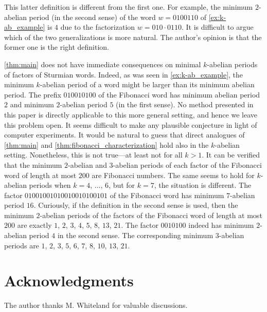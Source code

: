 \documentclass[a4paper,fleqn]{article}
\begin{document}
  This latter definition is different from the first one. For example, the minimum $2$-abelian period (in the second
  sense) of the word $w = 0100110$ of \autoref{ex:k-ab_example} is $4$ due to the factorization $w = 010 \cdot 0110$.
  It is difficult to argue which of the two generalizations is more natural. The author's opinion is that the former
  one is the right definition.

  \autoref{thm:main} does not have immediate consequences on minimal $k$-abelian periods of factors of Sturmian words.
  Indeed, as was seen in \autoref{ex:k-ab_example}, the minimum $k$-abelian period of a word might be larger than its
  minimum abelian period. The prefix $010010100$ of the Fibonacci word has minimum abelian period $2$ and minimum
  $2$-abelian period $5$ (in the first sense). No method presented in this paper is directly applicable to this more
  general setting, and hence we leave this problem open. It seems difficult to make any plausible conjecture in light
  of computer experiments. It would be natural to guess that direct analogues of \autoref{thm:main} and
  \autoref{thm:fibonacci_characterization} hold also in the $k$-abelian setting. Nonetheless, this is not true---at
  least not for all $k > 1$. It can be verified that the minimum $2$-abelian and $3$-abelian periods of each factor of
  the Fibonacci word of length at most $200$ are Fibonacci numbers. The same seems to hold for $k$-abelian periods when
  $k = 4$, $\ldots$, $6$, but for $k = 7$, the situation is different. The factor $01001001010010010100101$ of the
  Fibonacci word has minimum $7$-abelian period $16$. Curiously, if the definition in the second sense is used, then
  the minimum $2$-abelian periods of the factors of the Fibonacci word of length at most $200$ are exactly $1$, $2$,
  $3$, $4$, $5$, $8$, $13$, $21$. The factor $0010100$ indeed has minimum $2$-abelian period $4$ in the second sense.
  The corresponding minimum $3$-abelian periods are $1$, $2$, $3$, $5$, $6$, $7$, $8$, $10$, $13$, $21$.

  \section*{Acknowledgments}
  The author thanks M. Whiteland for valuable discussions.

  \printbibliography
  
\end{document}
